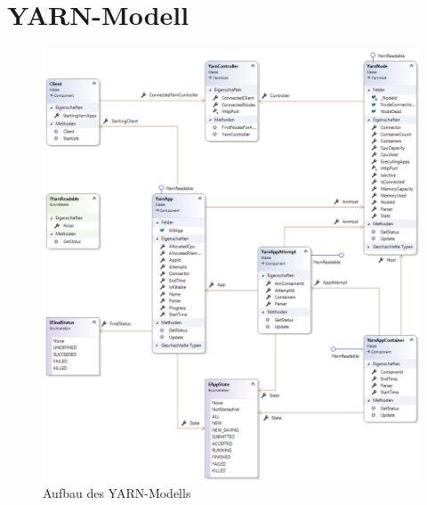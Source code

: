 \section{YARN-Modell}\label{sec:yarnModel}

\begin{figure}
	\centering
	\includegraphics[width=\columnwidth]{./images/yarnModel.png}
	\caption{Aufbau des YARN-Modells}
	\label{fig:hdfsarch}
\end{figure}